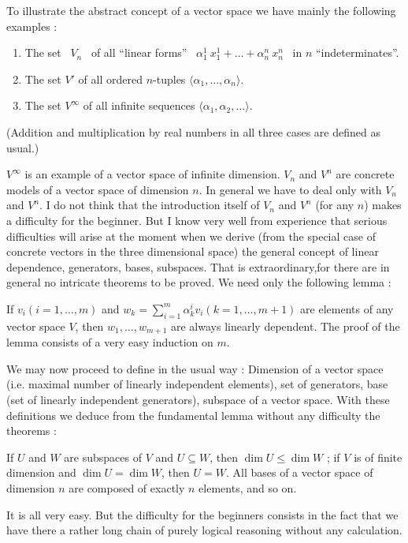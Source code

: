 To illustrate the abstract concept of a vector space we have mainly
the following examples :
\begin{enumerate}
\item The set ~$V_n$~ of all ``linear forms'' ~$\alpha^1_1 ~x^1_1 + \ldots
  + \alpha^n_n ~x^n_n$~ in $n$ ``indeterminates''.

\item The set $V'$ of all ordered $n$-tuples $\langle \alpha_1,
  \ldots, \alpha_n  \rangle$.

\item The set $V^\infty$ of all infinite sequences $\langle \alpha_1,
  \alpha_2, \ldots \rangle$.
\end{enumerate}

(Addition and multiplication by real numbers in all three cases are
defined as usual.)

$V^\infty$ is an example of a vector space of infinite
dimension. $V_n$ and $V^n$ are concrete models of a vector space of
dimension $n$. In general we have to deal only with $V_n$ and $V^n$. I
do not think that the introduction itself of $V_n$ and $V^n$ (for any
$n$) makes a difficulty for the beginner. But I know very well from
experience that serious difficulties will arise at the moment when we
derive (from the special case of concrete vectors in the three
dimensional space) the general concept of linear dependence,
generators, bases, subspaces. That is extraordinary,\pageoriginale for there are in
general no intricate theorems to be proved. We need only the following
lemma :

If $v_i (i = 1, \ldots, m)$ and $w_k = \sum\limits^m_{i=1} \alpha^i_k
v_i (k=1, \ldots , m+1)$ are elements of any vector space $V$, then
$w_1, \ldots, w_{m+1}$ are always linearly dependent. The proof of the
lemma consists of a very easy induction on $m$.

We may now proceed to define in the usual way : Dimension of a vector
space (i.e. maximal number of linearly independent elements), set of
generators, base (set of linearly independent generators), subspace of
a vector space. With these definitions we deduce from the fundamental
lemma without any difficulty the theorems :

If $U$ and $W$ are subspaces of $V$ and $U \subseteq W$, then $\dim U
\leqslant \dim W$ ; if $V$ is of finite dimension and $\dim U = \dim
W$, then $U = W$. All bases of a vector space of dimension $n$ are
composed of exactly $n$ elements, and so on.

It is all very easy. But the difficulty for the beginners consists in
the fact that we have there a rather long chain of purely logical
reasoning without any calculation.

